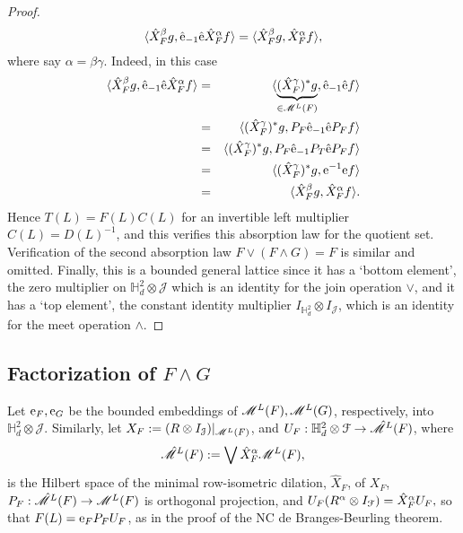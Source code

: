 \documentclass[11pt]{article}
\newcommand{\ba}{\begin{eqnarray}}
\newcommand{\ea}{\end{eqnarray}}
\newcommand{\nn}{\nonumber}
\newcommand{\mr}{\ensuremath{\mathrm}}
\newcommand{\scr}{\ensuremath{\mathscr}}
\newcommand{\mc}{\ensuremath{\mathcal}}
\newcommand{\ga}{\ensuremath{\gamma}}
\def\bH{\mathbb{H}}
\def\cJ{\mathcal{J}}
\newcommand{\J}{\ensuremath{\mathcal{J} }}
\newcommand{\ip}[2]{\ensuremath{\langle {#1} , {#2} \rangle}}
\numberwithin{equation}{section}
\numberwithin{subsection}{section}
\theoremstyle{definition}
\begin{document}
\begin{proof}
$$ \ip{\hat{X} _F ^\beta g}{\hat{\mr{e}} _{-1} \hat{\mr{e}} \hat{X} _F ^\alpha f} =  \ip{\hat{X} _F ^\beta g}{\hat{X} _F ^\alpha f},  $$ where say $\alpha = \beta \ga$. Indeed, in this case
\ba \ip{\hat{X} _F ^\beta g}{\hat{\mr{e}} _{-1} \hat{\mr{e}} \hat{X} _F ^\alpha f} & = & \ip{\underbrace{(\hat{X} _F ^\ga) ^* g}_{\in \scr{M} ^L (F)}}{\hat{\mr{e}}_{-1} \hat{\mr{e}} f } \nn \\
& = & \ip{(\hat{X} _F ^\ga) ^* g}{P_F \hat{\mr{e}}_{-1} \hat{\mr{e}} P_F f} \nn \\
& = & \ip{(\hat{X} _F ^\ga) ^* g}{P_F \hat{\mr{e}}_{-1} P_T \hat{\mr{e}} P_F f} \nn \\
& = & \ip{(\hat{X} _F ^\ga) ^* g}{\mr{e} ^{-1} \mr{e} f} \nn \\
& = & \ip{\hat{X} _F ^\beta g}{\hat{X} _F ^\alpha f}. \nn \ea
Hence $T(L) = F(L) C(L)$ for an invertible left multiplier $C(L) = D(L) ^{-1}$, and this verifies this absorption law for the quotient set. Verification of the second absorption law $ F \vee (F \wedge G)=F$ is similar and omitted. Finally, this is a bounded general lattice since it has a `bottom element', the zero multiplier on $\bH ^2 _d \otimes \J$ which is an identity for the join operation $\vee$, and it has a `top element', the constant identity multiplier $I_{\bH ^2_d} \otimes I_{\cJ}$, which is an identity for the meet operation $\wedge$.
\end{proof}






\subsection*{Factorization of $F\wedge G$}

Let $\mr{e} _{F} , \mr{e} _G$ be the bounded embeddings of $\scr{M} ^L (F), \scr{M} ^L (G)$, respectively, into $\bH ^2 _d \otimes \J$. Similarly, let $X_F := (R \otimes I_\J) | _{\scr{M} ^L (F)}$, and $U_F : \bH ^2 _d \otimes \mc{F} \rightarrow \hat{\scr{M}} ^L (F)$, where $$ \hat{\scr{M}} ^L (F) := \bigvee \hat{X} _F ^\alpha \scr{M} ^L (F), $$ is the Hilbert space of the minimal row-isometric dilation, $\hat{X} _F$, of $X_F$, $P_F : \hat{\scr{M}} ^L (F) \rightarrow \scr{M} ^L (F)$ is orthogonal projection, and 
$ U_F (R ^\alpha  \otimes I  _{\mc{F}} ) = \hat{X} _F ^\alpha U_F, $ so that 
$ F (L) = \mr{e} _F P _F U_F$, as in the proof of the NC de Branges-Beurling theorem. 
\end{document}
